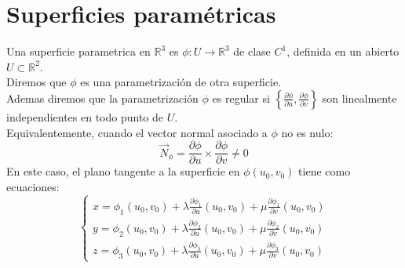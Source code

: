 \section{Superficies paramétricas}

\begin{definición}
    Una superficie parametrica en $\mathbb{R}^3$  es $\phi: U \to \mathbb{R}^3$ de clase $C^1$, definida en un abierto $U \subset \mathbb{R}^2$.\\
    Diremos que $\phi$ es una parametrización de otra superficie.\\
    Ademas diremos que la parametrización $\phi$ es regular si $ \left\{ \frac{\partial \phi}{\partial u}, \frac{\partial \phi}{\partial v} \right\}$ son linealmente independientes en todo punto de $U$.\\
    Equivalentemente, cuando el vector normal asociado a $\phi$ no es nulo:\\
    $$ \vec{N}_\phi = \frac{\partial \phi}{\partial u} \times \frac{\partial \phi}{\partial v} \neq 0 $$
    En este caso, el plano tangente a la superficie en $\phi(u_0, v_0)$ tiene como ecuaciones:\\
    $$
    \begin{cases}
        x = \phi_1(u_0, v_0) + \lambda \frac{\partial \phi_1}{\partial u}(u_0, v_0) + \mu \frac{\partial \phi_1}{\partial v}(u_0, v_0) \\
        y = \phi_2(u_0, v_0) + \lambda \frac{\partial \phi_2}{\partial u}(u_0, v_0) + \mu \frac{\partial \phi_2}{\partial v}(u_0, v_0) \\
        z = \phi_3(u_0, v_0) + \lambda \frac{\partial \phi_3}{\partial u}(u_0, v_0) + \mu \frac{\partial \phi_3}{\partial v}(u_0, v_0)
    \end{cases}
    $$
\end{definición}


